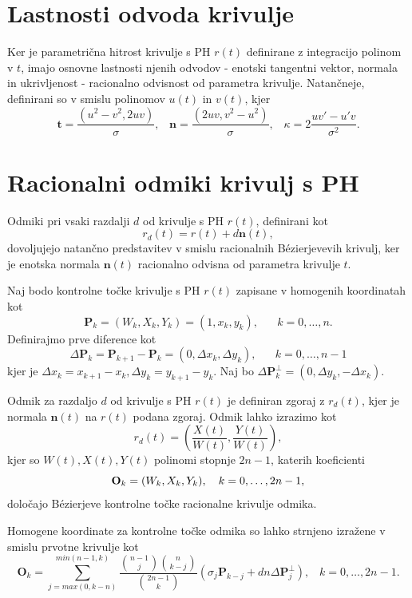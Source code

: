 \documentclass[a4paper]{article}
\begin{document}
	\section{Lastnosti odvoda krivulje}
	Ker je parametrična hitrost krivulje s PH $r (t)$ definirane z integracijo polinom v $t$, imajo osnovne lastnosti njenih odvodov - enotski tangentni vektor, normala in ukrivljenost - racionalno odvisnost od parametra krivulje. Natančneje, definirani so v smislu polinomov $u (t)$ in $v (t)$, kjer
	$$\textbf{t} =\frac{(u^2 - v^2, 2uv)}{\sigma},\hspace{10pt} \textbf{n} =\frac{(2uv, v^2 - u^2)}{\sigma},\hspace{10pt} \kappa = 2 \frac{uv\prime - u\prime v}{\sigma^2}.$$
	
	\section{Racionalni odmiki krivulj s PH}
	Odmiki pri vsaki razdalji $d$ od krivulje s PH $r (t)$, definirani kot
	$$r_d (t) = r (t) + d \textbf{n} (t),$$
	dovoljujejo natančno predstavitev v smislu racionalnih B\'ezierjevevih krivulj, ker je enotska normala $\textbf{n} (t)$ racionalno odvisna od parametra krivulje $t$. 
	
	Naj bodo kontrolne točke krivulje s PH $r (t)$ zapisane v homogenih koordinatah kot
	$$\textbf{P}_k = (W_k, X_k, Y_k) = (1, x_k, y_k),\hspace{20pt} k = 0,\ldots , n.$$
	Definirajmo prve diference kot
	$$\Delta\textbf{P}_k = \textbf{P}_{k + 1} - \textbf{P}_k = (0, \Delta x_k, \Delta y_k),\hspace{20pt} k = 0,\ldots, n - 1$$
	kjer je $\Delta x_k = x_{k + 1}- x_k, \Delta y_k = y_{k + 1}- y_k$. Naj bo $\Delta\textbf{P}_k^\perp = (0, \Delta y_k, -\Delta x_k).$
	
	Odmik za razdaljo $d$ od krivulje s PH $r (t)$ je definiran zgoraj z $r_d(t)$, kjer je normala $\textbf{n}(t)$ na $r (t)$ podana zgoraj. Odmik lahko izrazimo kot
	$$r_d (t) = \left(\frac{X (t)}{W(t)},\frac{Y(t)}{W(t)}\right),$$
	kjer so $W (t), X (t), Y (t)$ polinomi stopnje $2n - 1$, katerih koeficienti
	$$\textbf{O}_k = (W_k, X_k, Y_k), \hspace{10px} k = 0,\ldots , 2n - 1,$$
	določajo B\'ezierjeve kontrolne točke racionalne krivulje odmika.
	
	Homogene koordinate za kontrolne točke odmika so lahko strnjeno izražene v smislu prvotne krivulje kot
	$$\textbf{O}_k =\sum^{min (n - 1, k)}_{j = max (0, k - n)}\frac{\binom{n-1}{j}\binom{n}{k-j}}{\binom{2n-1}{k}}(\sigma_j\textbf{P}_{k-j}+dn\Delta\textbf{P}_j^\perp), \hspace{10pt} k = 0,\ldots, 2n - 1.$$
	
\end{document}
